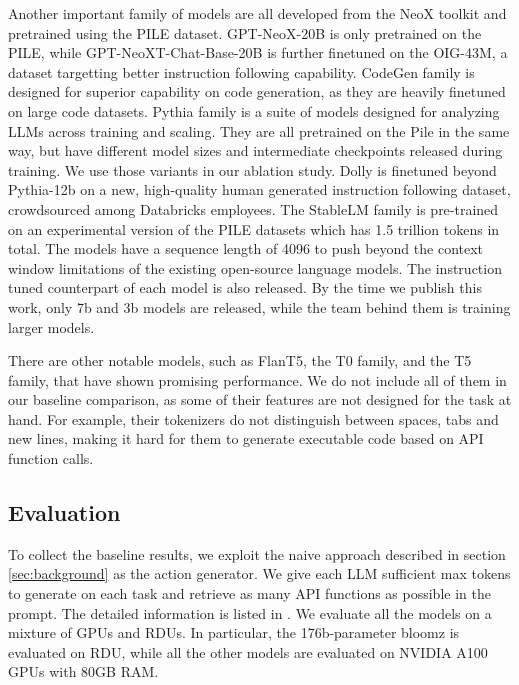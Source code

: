 Another important family of models are all developed from the NeoX toolkit\cite{gpt-neox-library} and pretrained using the PILE dataset\cite{gao2020pile}. 
GPT-NeoX-20B\cite{black2022gpt} is only pretrained on the PILE, while GPT-NeoXT-Chat-Base-20B\cite{openchatkit} is further finetuned on the OIG-43M\cite{oig-data}, a dataset targetting better instruction following capability. 
CodeGen family\cite{nijkamp2022codegen} is designed for superior capability on code generation, as they are heavily finetuned on large code datasets. 
Pythia family\cite{biderman2023pythia} is a suite of models designed for analyzing LLMs across training and scaling. They are all pretrained on the Pile in the same way, but have different model sizes and intermediate checkpoints released during training. We use those variants in our ablation study.
Dolly\cite{dolly} is finetuned beyond Pythia-12b on a new, high-quality human generated instruction following dataset, crowdsourced among Databricks employees.
The StableLM family\cite{stablelm} is pre-trained on an experimental version of the PILE datasets which has 1.5 trillion tokens in total. The models have a sequence length of 4096 to push beyond the context window limitations of the existing open-source language models. The instruction tuned counterpart of each model is also released. By the time we publish this work, only 7b and 3b models are released, while the team behind them is training larger models. 

There are other notable models, such as FlanT5\cite{chung2022scaling}, the T0 family\cite{sanh2021multitask}, and the T5 family\cite{raffel2020exploring}, that have shown promising performance. We do not include all of them in our baseline comparison, as some of their features are not designed for the task at hand. For example, their tokenizers do not distinguish between spaces, tabs and new lines, making it hard for them to generate executable code based on API function calls.


\subsection{Evaluation}


To collect the baseline results, we exploit the naive approach described in section \ref{sec:background} as the action generator. 
We give each LLM sufficient max tokens to generate on each task and retrieve as many API functions as possible in the prompt. The detailed information is listed in . We evaluate all the models on a mixture of GPUs and RDUs\cite{koeplinger2018spatial, prabhakar2017plasticine, prabhakar2021sambanova}. In particular, the 176b-parameter bloomz is evaluated on RDU, while all the other models are evaluated on NVIDIA A100 GPUs with 80GB RAM. 

